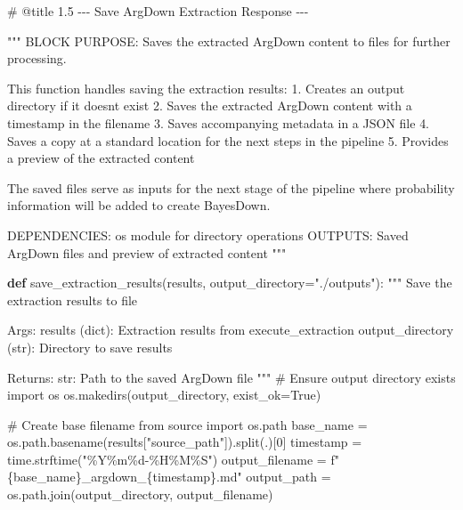 \documentclass[
  11pt,
  letterpaper,
]{book}
\newenvironment{Shaded}{\begin{snugshade}}{\end{snugshade}}
\newcommand{\CommentTok}[1]{\textcolor[rgb]{0.37,0.37,0.37}{#1}}
\newcommand{\DecValTok}[1]{\textcolor[rgb]{0.68,0.00,0.00}{#1}}
\newcommand{\ImportTok}[1]{\textcolor[rgb]{0.00,0.46,0.62}{#1}}
\newcommand{\KeywordTok}[1]{\textcolor[rgb]{0.00,0.23,0.31}{\textbf{#1}}}
\newcommand{\NormalTok}[1]{\textcolor[rgb]{0.00,0.23,0.31}{#1}}
\newcommand{\OperatorTok}[1]{\textcolor[rgb]{0.37,0.37,0.37}{#1}}
\newcommand{\SpecialCharTok}[1]{\textcolor[rgb]{0.37,0.37,0.37}{#1}}
\newcommand{\SpecialStringTok}[1]{\textcolor[rgb]{0.13,0.47,0.30}{#1}}
\newcommand{\StringTok}[1]{\textcolor[rgb]{0.13,0.47,0.30}{#1}}
\newcommand{\VariableTok}[1]{\textcolor[rgb]{0.07,0.07,0.07}{#1}}
\begin{document}
\begin{Shaded}
\begin{Highlighting}[]
\CommentTok{\# @title 1.5 {-}{-}{-} Save ArgDown Extraction Response {-}{-}{-}}

\CommentTok{"""}
\CommentTok{BLOCK PURPOSE: Saves the extracted ArgDown content to files for further processing.}

\CommentTok{This function handles saving the extraction results:}
\CommentTok{1. Creates an output directory if it doesn\textquotesingle{}t exist}
\CommentTok{2. Saves the extracted ArgDown content with a timestamp in the filename}
\CommentTok{3. Saves accompanying metadata in a JSON file}
\CommentTok{4. Saves a copy at a standard location for the next steps in the pipeline}
\CommentTok{5. Provides a preview of the extracted content}

\CommentTok{The saved files serve as inputs for the next stage of the pipeline where}
\CommentTok{probability information will be added to create BayesDown.}

\CommentTok{DEPENDENCIES: os module for directory operations}
\CommentTok{OUTPUTS: Saved ArgDown files and preview of extracted content}
\CommentTok{"""}

\KeywordTok{def}\NormalTok{ save\_extraction\_results(results, output\_directory}\OperatorTok{=}\StringTok{"./outputs"}\NormalTok{):}
    \CommentTok{"""}
\CommentTok{    Save the extraction results to file}

\CommentTok{    Args:}
\CommentTok{        results (dict): Extraction results from execute\_extraction}
\CommentTok{        output\_directory (str): Directory to save results}

\CommentTok{    Returns:}
\CommentTok{        str: Path to the saved ArgDown file}
\CommentTok{    """}
    \CommentTok{\# Ensure output directory exists}
    \ImportTok{import}\NormalTok{ os}
\NormalTok{    os.makedirs(output\_directory, exist\_ok}\OperatorTok{=}\VariableTok{True}\NormalTok{)}

    \CommentTok{\# Create base filename from source}
    \ImportTok{import}\NormalTok{ os.path}
\NormalTok{    base\_name }\OperatorTok{=}\NormalTok{ os.path.basename(results[}\StringTok{"source\_path"}\NormalTok{]).split(}\StringTok{\textquotesingle{}.\textquotesingle{}}\NormalTok{)[}\DecValTok{0}\NormalTok{]}
\NormalTok{    timestamp }\OperatorTok{=}\NormalTok{ time.strftime(}\StringTok{"\%Y\%m}\SpecialCharTok{\%d}\StringTok{{-}\%H\%M\%S"}\NormalTok{)}
\NormalTok{    output\_filename }\OperatorTok{=} \SpecialStringTok{f"}\SpecialCharTok{\{}\NormalTok{base\_name}\SpecialCharTok{\}}\SpecialStringTok{\_argdown\_}\SpecialCharTok{\{}\NormalTok{timestamp}\SpecialCharTok{\}}\SpecialStringTok{.md"}
\NormalTok{    output\_path }\OperatorTok{=}\NormalTok{ os.path.join(output\_directory, output\_filename)}


\end{Highlighting}
\end{Shaded}
\end{document}
